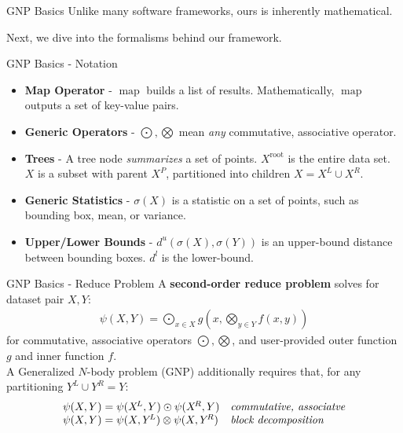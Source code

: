 \documentclass[pdf,colorBG,slideColor]{prosper}
\newcommand{\itemt}[1]{\item {\bf #1} -}
\newcommand{\union}{\cup}
\DeclareMathOperator*{\map}{map}
\newcommand{\gnp}{\psi}
\newcommand{\defterm}[1]{{\bf #1}}
\newcommand{\kdroot}[1]{#1^{\text{root}}}
\newcommand{\kdleft}[1]{#1^{\!L}}
\newcommand{\kdright}[1]{#1^{\!R}}
\newcommand{\kdparent}[1]{#1^{\!P}}
\newcommand{\lo}[1]{#1^{l}}
\newcommand{\up}[1]{#1^{u}}
\newcommand{\distlo}{\lo{d}}
\newcommand{\distup}{\up{d}}
\newcommand{\outstat}{\sigma}
\begin{document}
\begin{slide}{GNP Basics}
  Unlike many software frameworks, ours is inherently mathematical.

  Next, we dive into the formalisms behind our framework.
\end{slide}

\begin{slide}{GNP Basics - Notation}
  \begin{itemize}
    \itemt{Map Operator} $\map$ builds a list of results.
    Mathematically, $\map$ outputs a set of key-value pairs.
    \itemt{Generic Operators} $\bigodot, \bigotimes$ mean {\em any} commutative, associative operator.
    \itemt{Trees} A tree node {\em summarizes} a set of points.
    $\kdroot{X}$ is the entire data set.
    $X$ is a subset with parent $\kdparent{X}$,
    partitioned into children $X = \kdleft{X} \union \kdright{X}$.
    \itemt{Generic Statistics} $\outstat(X)$ is a statistic on a set of points,
    such as bounding box, mean, or variance.
    \itemt{Upper/Lower Bounds} $\distup(\outstat(X), \outstat(Y))$ is an upper-bound distance
    between bounding boxes.  $\distlo$ is the lower-bound.
  \end{itemize}
\end{slide}

\begin{slide}{GNP Basics - Reduce Problem}
  A \defterm{second-order reduce problem} solves for dataset pair $X, Y$:
    \[\begin{array}{l}
      \displaystyle \gnp(X, Y) = \bigodot_{x \in X} g\!\left(x, \bigotimes_{y \in Y} f(x, y) \right)
    \end{array}\]
  for commutative, associative operators $\bigodot, \bigotimes$, and user-provided
  outer function $g$ and inner function $f$.
  \\
  A Generalized $N$-body problem (GNP) additionally requires that, for any partitioning $\kdleft{Y} \union \kdright{Y} = Y$:
    \[\begin{array}{ll}
     \gnp(X,Y) = \gnp(\kdleft{X}, Y) \odot \gnp(\kdright{X},Y) & \text{\it commutative, associatve}
     \\
     \gnp(X,Y) = \gnp(X,\kdleft{Y}) \otimes \gnp(X,\kdright{Y}) & \text{\it block decomposition}
    \end{array}\]
\end{slide}
\end{document}
